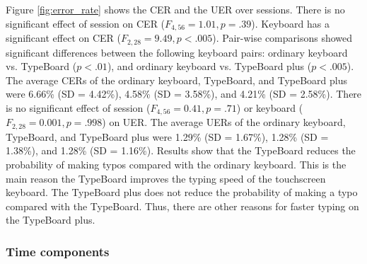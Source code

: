 Figure \ref{fig:error_rate} shows the CER and the UER over sessions. There is no significant effect of session on CER ($F_{4,56}=1.01,p=.39$). Keyboard has a significant effect on CER ($F_{2,28}=9.49,p<.005$). Pair-wise comparisons showed significant differences between the following keyboard pairs: ordinary keyboard vs. TypeBoard ($p<.01$), and ordinary keyboard vs. TypeBoard plus ($p<.005$). The average CERs of the ordinary keyboard, TypeBoard, and TypeBoard plus were 6.66\% (SD = 4.42\%), 4.58\% (SD = 3.58\%), and 4.21\% (SD = 2.58\%).
There is no significant effect of session ($F_{4,56}=0.41,p=.71$) or keyboard ($F_{2,28}=0.001,p=.998$) on UER. The average UERs of the ordinary keyboard, TypeBoard, and TypeBoard plus were 1.29\% (SD = 1.67\%), 1.28\% (SD = 1.38\%), and 1.28\% (SD = 1.16\%).
Results show that the TypeBoard reduces the probability of making typos compared with the ordinary keyboard. This is the main reason the TypeBoard improves the typing speed of the touchscreen keyboard. The TypeBoard plus does not reduce the probability of making a typo compared with the TypeBoard. Thus, there are other reasons for faster typing on the TypeBoard plus.



\subsubsection{Time components}

